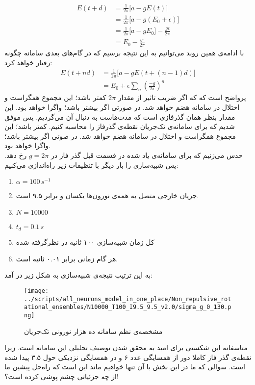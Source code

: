 \begin{align}
	E(t+d) &= \frac{1}{2\pi} \big[ a - g E(t) \big]\\
	&=  \frac{1}{2\pi} \big[ a - g (E_0 + \epsilon) \big]\\
	&=  \frac{1}{2\pi} \big[ a - g E_0 \big] - \frac{g\epsilon}{2\pi}\\
	&= E_0 - \frac{g\epsilon}{2\pi} 
\end{align}
با ادامه‌ی همین روند می‌توانیم به این نتیجه برسیم که در گام‌های بعدی سامانه چگونه رفتار خواهد کرد:
\begin{align}
	E(t + nd) &= \frac{1}{2\pi} \big[ a - g E(t+(n-1)d) \big]\\
	&= E_0 + \epsilon \sum_n (\frac{-g}{2\pi})^n
	\label{eq:geometric_sum}
\end{align}
پرواضح است که که اگر ضریب تاثیر از مقدار 
$2\pi$
کمتر باشد؛ این مجموع همگراست و اختلال در سامانه هضم خواهد شد. در صورتی اگر بیشتر باشد؛ واگرا خواهد بود. این مقدار بنظر همان گذرفازی است که مدت‌هاست به دنبال آن می‌گردیم. پس موفق شدیم که برای سامانه‌ی تک‌جریان نقطه‌ی گذرفاز را محاسبه کنیم. کمتر باشد؛ این مجموع همگراست و اختلال در سامانه‌ هضم خواهد شد. در صوتی اگر بیشتر باشد؛ واگرا خواهد بود.\\

حدس می‌زنیم که برای سامانه‌ی یاد شده در قسمت قبل گذر فاز در 
$g = 2\pi$
رخ دهد. پس شبیه‌سازی را بار دیگر با تنظیمات زیر راه‌اندازی می‌کنیم:

\begin{tcolorbox}[colback=green!5!white,colframe=green!75!black]
	\begin{enumerate}[*]
		\item
		$\alpha = 100\, s^{-1}$
		\item
		جریان خارجی متصل به همه‌ی نورون‌ها یکسان و برابر ۹.۵ است.
		\item
		$N = 10000$
		\item
		$t_d = 0.1\, s$ 
		\item 
		کل زمان شبیه‌سازی ۱۰۰ ثانیه در نظرگرفته شده
		\item 
		هر گام زمانی برابر ۰.۰۱ ثانیه است.
	\end{enumerate}
\end{tcolorbox}
به این ترتیب نتیجه‌ی شبیه‌سازی به شکل زیر در آمد:
\begin{figure}[h]
	\centering
	\texttt{[image: ../scripts/all\_neurons\_model\_in\_one\_place/Non\_repulsive\_rotational\_ensembles/N10000\_T100\_I9.5\_9.5\_v2.0/sigma\_g\_0\_130.png]}
	\caption{مشخصه‌ی نظم سامانه ده هزار نورونی تک‌جریان}
	\label{fig:sigma_non_repulsive_single_input}
\end{figure}
متاسفانه این شکستی برای امید به محقق شدن توصیف تحلیلی این سامانه است. زیرا نقطه‌ی گذر فاز کاملا دور از همسایگی عدد ۶ و در همسایگی نزدیکی حول ۳.۵ پیدا شده است. سوالی که ما در این بخش با آن تنها خواهیم ماند این است که راه‌حل پیشین ما از چه جزئیاتی چشم پوشی کرده است؟!

